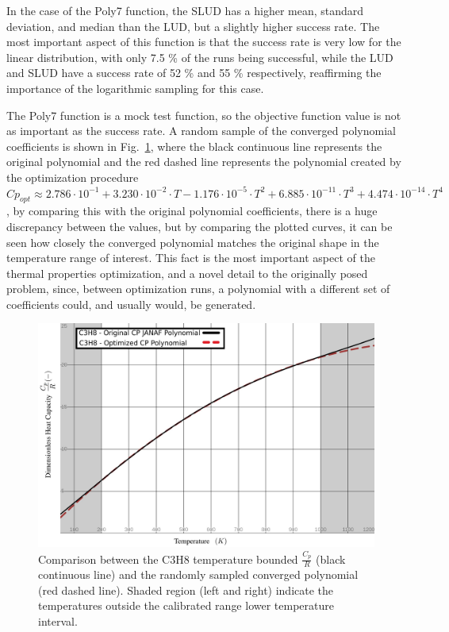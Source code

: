 \documentclass[10pt,fleqn,a4paper,twoside]{article}
\begin{document}
In the case of the Poly7 function, the SLUD has a higher mean, standard deviation, and median than the LUD, but a slightly higher success rate. The most important aspect of this function is that the
success rate is very low for the linear distribution, with only 7.5 \% of the runs being successful, while the LUD and SLUD have a success rate of 52 \% and 55 \% respectively, reaffirming the importance
of the logarithmic sampling for this case.

The Poly7 function is a mock test function, so the objective function value is not as important as the success rate.
A random sample of the converged polynomial coefficients is shown in Fig.~\ref{Fig:1}, where the black continuous line represents the original polynomial and the red dashed line
represents the polynomial created by the optimization procedure $Cp_{opt} \approx 2.786\cdot10^{-1} + 3.230\cdot10^{-2}\cdot T -1.176\cdot10^{-5}\cdot T^2 + 6.885\cdot10^{-11}\cdot T^3 + 4.474\cdot10^{-14}\cdot T^4$, by comparing 
this with the original polynomial coefficients, there is a huge discrepancy between the values, but by comparing the plotted curves, it can be seen how closely the converged polynomial matches the 
original shape in the temperature range of interest. This fact is the most important aspect of the thermal properties optimization, and a novel detail to the originally posed problem, since, between optimization runs,
a polynomial with a different set of coefficients could, and usually would, be generated.

\begin{figure}[h!]
\centering
\includegraphics[angle=0, width=17cm]{C3H8.jpeg}
\caption{Comparison between the C3H8 temperature bounded $\frac{C_p}{R}$ (black continuous line) and the randomly sampled converged polynomial (red dashed line). Shaded region (left and right) indicate the temperatures outside the calibrated range lower temperature interval.}
\label{Fig:1}
\end{figure}
\end{document}
